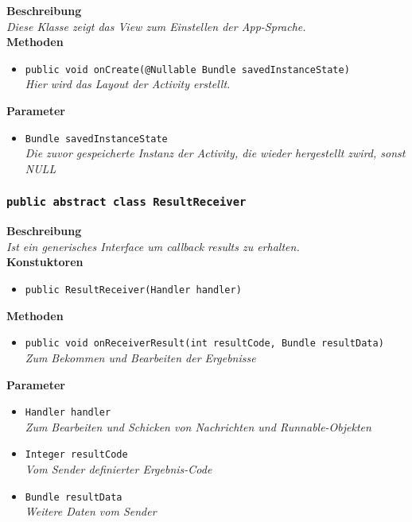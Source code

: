	\textbf{Beschreibung} \\
	\textit{Diese Klasse zeigt das View zum Einstellen der App-Sprache.} \\

	\textbf{Methoden}
	\begin{itemize}
		\item\texttt{{public void onCreate(@Nullable Bundle savedInstanceState)}}\\
	\textit{Hier wird das Layout der Activity erstellt.}\\
	\end{itemize}

	\textbf{Parameter}
	\begin{itemize}
		\item\texttt{Bundle savedInstanceState}\\  
	\textit{Die zuvor gespeicherte Instanz der Activity, die wieder hergestellt zwird, sonst NULL}\\
	\end{itemize} 

\subsubsection{\texttt{public abstract class ResultReceiver}}

	\textbf{Beschreibung} \\
	\textit{Ist ein generisches Interface um callback results zu erhalten.} \\

	\textbf{Konstuktoren}
	\begin{itemize}
		\item\texttt{{public ResultReceiver(Handler handler)}}\\
	\end{itemize}

	\textbf{Methoden}
	\begin{itemize}
		\item\texttt{{public void onReceiverResult(int resultCode, Bundle resultData)}}\\
	\textit{Zum Bekommen und Bearbeiten der Ergebnisse}\\
	\end{itemize}

	\textbf{Parameter}
	\begin{itemize}
		\item\texttt{Handler handler}\\ 
	\textit{Zum Bearbeiten und Schicken von Nachrichten und Runnable-Objekten}\\
			\item\texttt{Integer resultCode}\\ 
	\textit{Vom Sender definierter Ergebnis-Code}\\
	\item\texttt{Bundle resultData}\\ 
	\textit{Weitere Daten vom Sender }\\
	\end{itemize}

